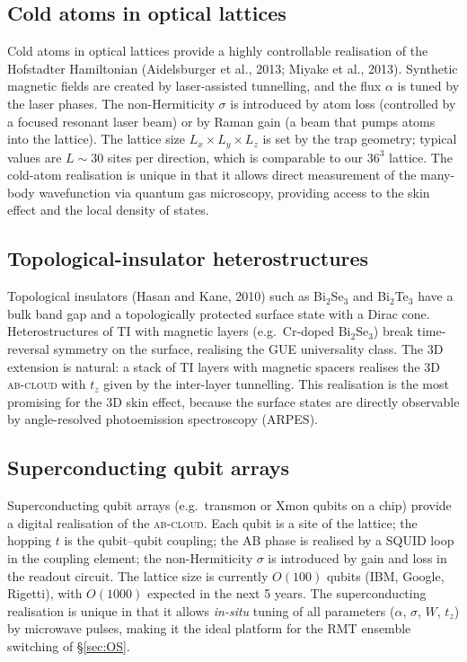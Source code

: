 \documentclass[11pt,a4paper]{article}
\theoremstyle{plain}
\theoremstyle{definition}
\theoremstyle{remark}
\newcommand{\Abcloud}{\textsc{ab-cloud}}
\begin{document}
\subsection{Cold atoms in optical lattices}

Cold atoms in optical lattices provide a highly controllable realisation of the Hofstadter Hamiltonian (Aidelsburger et al., 2013; Miyake et al., 2013). Synthetic magnetic fields are created by laser-assisted tunnelling, and the flux $\alpha$ is tuned by the laser phases. The non-Hermiticity $\sigma$ is introduced by atom loss (controlled by a focused resonant laser beam) or by Raman gain (a beam that pumps atoms into the lattice). The lattice size $L_x\times L_y\times L_z$ is set by the trap geometry; typical values are $L\sim 30$ sites per direction, which is comparable to our $36^3$ lattice. The cold-atom realisation is unique in that it allows direct measurement of the many-body wavefunction via quantum gas microscopy, providing access to the skin effect and the local density of states.

\subsection{Topological-insulator heterostructures}

Topological insulators (Hasan and Kane, 2010) such as Bi$_2$Se$_3$ and Bi$_2$Te$_3$ have a bulk band gap and a topologically protected surface state with a Dirac cone. Heterostructures of TI with magnetic layers (e.g.\ Cr-doped Bi$_2$Se$_3$) break time-reversal symmetry on the surface, realising the GUE universality class. The 3D extension is natural: a stack of TI layers with magnetic spacers realises the 3D \Abcloud{} with $t_z$ given by the inter-layer tunnelling. This realisation is the most promising for the 3D skin effect, because the surface states are directly observable by angle-resolved photoemission spectroscopy (ARPES).

\subsection{Superconducting qubit arrays}

Superconducting qubit arrays (e.g.\ transmon or Xmon qubits on a chip) provide a digital realisation of the \Abcloud{}. Each qubit is a site of the lattice; the hopping $t$ is the qubit--qubit coupling; the AB phase is realised by a SQUID loop in the coupling element; the non-Hermiticity $\sigma$ is introduced by gain and loss in the readout circuit. The lattice size is currently $O(100)$ qubits (IBM, Google, Rigetti), with $O(1000)$ expected in the next 5 years. The superconducting realisation is unique in that it allows \emph{in-situ} tuning of all parameters ($\alpha$, $\sigma$, $W$, $t_z$) by microwave pulses, making it the ideal platform for the RMT ensemble switching of \S\ref{sec:OS}.
\end{document}
